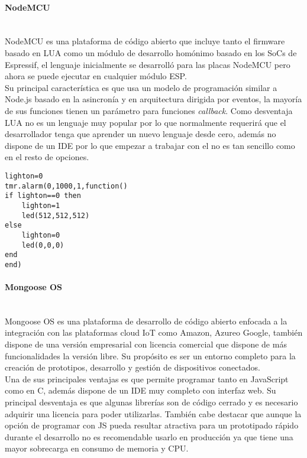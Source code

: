 \documentclass[../proyecto.tex]{subfiles}
\begin{document}
\paragraph{NodeMCU}\mbox{}\\
NodeMCU es una plataforma de código abierto que incluye tanto el firmware basado en LUA como un módulo de desarrollo homónimo basado en los SoCs de Espressif, el lenguaje inicialmente se desarrolló para las placas NodeMCU pero ahora se puede ejecutar en cualquier módulo ESP.\\

Su principal característica es que usa un modelo de programación similar a Node.js basado en la  asincronía  y en arquitectura dirigida por eventos, la mayoría de sus funciones tienen un parámetro para funciones \textit{callback}. Como desventaja LUA no es un lenguaje muy popular por lo que normalmente requerirá que el desarrollador tenga que aprender un nuevo lenguaje desde cero, además no dispone de un IDE por lo que empezar a trabajar con el no es tan sencillo como en el resto de opciones.\\

\begin{minipage}{\linewidth}
\begin{lstlisting}[language={[5.0]Lua}, caption=Ejemplo de código para hacer parpadear un led con NodeMCU, captionpos=b, frame=single]
lighton=0
tmr.alarm(0,1000,1,function()
if lighton==0 then
    lighton=1
    led(512,512,512)
else
    lighton=0
    led(0,0,0)
end
end)
\end{lstlisting}
\end{minipage}

\paragraph{Mongoose OS}\mbox{}\\
Mongoose OS es una plataforma de desarrollo de código abierto enfocada a la integración con las plataformas cloud IoT como Amazon, Azureo Google, también dispone de una versión empresarial con licencia comercial que dispone de más funcionalidades la versión libre. Su propósito es ser un entorno completo para la creación de prototipos, desarrollo y gestión de dispositivos conectados.\\

Una de sus principales ventajas es que permite programar tanto en JavaScript como en C, además dispone de un IDE muy completo con interfaz web. Su principal desventaja es que algunas librerías son de código cerrado y es necesario adquirir una licencia para poder utilizarlas. También cabe destacar que aunque la opción de programar con JS pueda resultar atractiva para un prototipado rápido durante el desarrollo no es recomendable usarlo en producción ya que tiene una mayor sobrecarga en consumo de memoria y CPU.\\
\end{document}

